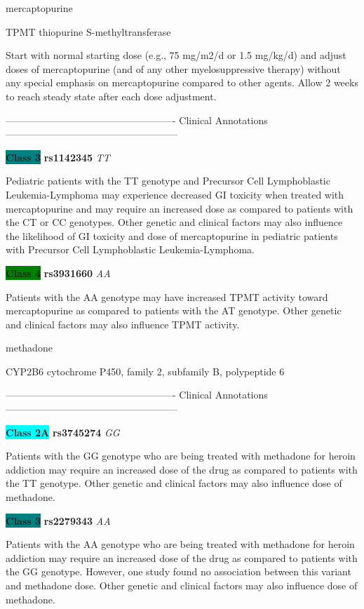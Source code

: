 \documentclass{resume} %
\begin{document}
\begin{rSection}{ mercaptopurine }
\begin{rSubsection}{ TPMT }{ thiopurine S-methyltransferase }{}{}
\item[] Start with normal starting dose (e.g., 75 mg/m2/d or 1.5 mg/kg/d) and adjust doses of mercaptopurine (and of any other myelosuppressive therapy) without any special emphasis on mercaptopurine compared to other agents. Allow 2 weeks to reach steady state after each dose adjustment.
\item[] ---------------------------------------------------- Clinical Annotations -----------------------------------------------------\newline
\item \textbf{\colorbox{teal} {Class 3}} \textbf{ rs1142345 } \textit{ TT }
\item[] Pediatric patients with the TT genotype and Precursor Cell Lymphoblastic Leukemia-Lymphoma may experience decreased GI toxicity when treated with mercaptopurine and may require an increased dose as compared to patients with the CT or CC genotypes. Other genetic and clinical factors may also influence the likelihood of GI toxicity and dose of mercaptopurine in pediatric patients with Precursor Cell Lymphoblastic Leukemia-Lymphoma.\item \textbf{\colorbox{green} {Class 4}} \textbf{ rs3931660 } \textit{ AA }
\item[] Patients with the AA genotype may have increased TPMT activity toward mercaptopurine as compared to patients with the AT genotype. Other genetic and clinical factors may also influence TPMT activity. 
\end{rSubsection}

\end{rSection}\begin{rSection}{ methadone }
\item[]

\begin{rSubsection}{ CYP2B6 }{ cytochrome P450, family 2, subfamily B, polypeptide 6 }{}{}
\item[]

\item[] ---------------------------------------------------- Clinical Annotations -----------------------------------------------------\newline
\item \textbf{\colorbox{cyan} {Class 2A}} \textbf{ rs3745274 } \textit{ GG }
\item[] Patients with the GG genotype who are being treated with methadone for heroin addiction may require an increased dose of the drug as compared to patients with the TT genotype. Other genetic and clinical factors may also influence dose of methadone.\item \textbf{\colorbox{teal} {Class 3}} \textbf{ rs2279343 } \textit{ AA }
\item[] Patients with the AA genotype who are being treated with methadone for heroin addiction may require an increased dose of the drug as compared to patients with the GG genotype. However, one study found no association between this variant and methadone dose. Other genetic and clinical factors may also influence dose of methadone.
\end{rSubsection}


\end{rSection}
\end{document}
